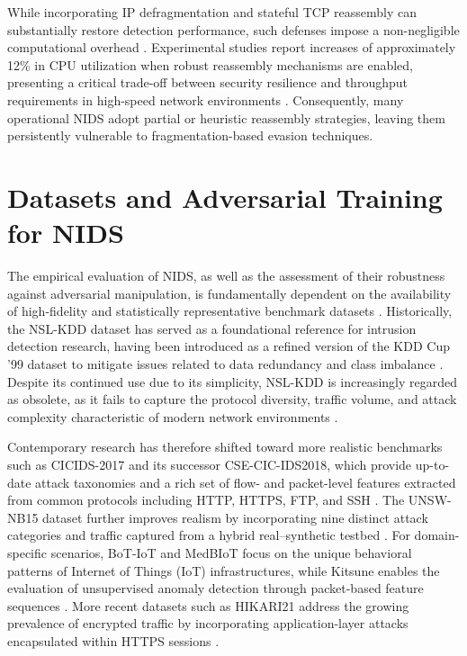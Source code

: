 While incorporating IP defragmentation and stateful TCP reassembly can substantially restore detection performance, such defenses impose a non-negligible computational overhead \cite{md2025guardians}. 
Experimental studies report increases of approximately 12\% in CPU utilization when robust reassembly mechanisms are enabled, presenting a critical trade-off between security resilience and throughput requirements in high-speed network environments \cite{md2025guardians}. 
Consequently, many operational NIDS adopt partial or heuristic reassembly strategies, leaving them persistently vulnerable to fragmentation-based evasion techniques.

\section{Datasets and Adversarial Training for NIDS}

The empirical evaluation of NIDS, as well as the assessment of their robustness against adversarial manipulation, is fundamentally dependent on the availability of high-fidelity and statistically representative benchmark datasets \cite{he2023adversarial}. 
Historically, the NSL-KDD dataset has served as a foundational reference for intrusion detection research, having been introduced as a refined version of the KDD Cup '99 dataset to mitigate issues related to data redundancy and class imbalance \cite{alasad2026comprehensive}. 
Despite its continued use due to its simplicity, NSL-KDD is increasingly regarded as obsolete, as it fails to capture the protocol diversity, traffic volume, and attack complexity characteristic of modern network environments \cite{merzouk2022investigating}.

Contemporary research has therefore shifted toward more realistic benchmarks such as CICIDS-2017 and its successor CSE-CIC-IDS2018, which provide up-to-date attack taxonomies and a rich set of flow- and packet-level features extracted from common protocols including HTTP, HTTPS, FTP, and SSH \cite{alasad2026comprehensive}. 
The UNSW-NB15 dataset further improves realism by incorporating nine distinct attack categories and traffic captured from a hybrid real–synthetic testbed \cite{abou2020evaluation}. 
For domain-specific scenarios, BoT-IoT and MedBIoT focus on the unique behavioral patterns of Internet of Things (IoT) infrastructures, while Kitsune enables the evaluation of unsupervised anomaly detection through packet-based feature sequences \cite{jiang2022fgmd}. 
More recent datasets such as HIKARI21 address the growing prevalence of encrypted traffic by incorporating application-layer attacks encapsulated within HTTPS sessions \cite{vitorino2025reliable}.

